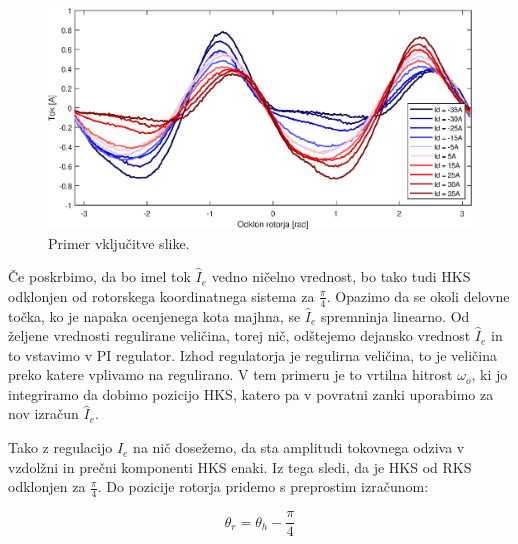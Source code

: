 \documentclass[a4paper,twoside,openright,12pt,slovene]{book}
\begin{document}
\begin{figure}[!htbp]
    \centering
    \includegraphics[width=1\columnwidth]{Slike/reguliranaVelicinaIs.eps}
    \caption{\label{reguliranaVelicinaIs} Primer vključitve slike.}
\end{figure}

Če poskrbimo, da bo imel tok $\hat{I}_{e}$ vedno ničelno vrednost, bo tako tudi HKS odklonjen od rotorskega koordinatnega sistema za $\frac{\pi}{4}$. Opazimo da se okoli delovne točka, ko je napaka
ocenjenega kota majhna, se $\hat{I}_{e}$ spremninja linearno. Od željene vrednosti regulirane veličina, torej nič, odštejemo dejansko vrednost $\hat{I}_{e}$ in to vstavimo v PI regulator. Izhod
regulatorja je regulirna veličina, to je veličina preko katere vplivamo na regulirano. V tem primeru je to vrtilna hitrost $\omega_o$, ki jo integriramo da dobimo pozicijo HKS, katero pa v povratni zanki
uporabimo za nov izračun $\hat{I}_{e}$. 

Tako z regulacijo $\hat{I}_{e}$ na nič dosežemo, da sta amplitudi tokovnega odziva v vzdolžni in prečni komponenti HKS enaki. Iz tega sledi, da je HKS od RKS odklonjen za $\frac{\pi}{4}$. Do pozicije
rotorja pridemo s preprostim izračunom:

\begin{equation}
    \theta_{r} = \theta_{h} - \frac{\pi}{4}
\end{equation}
\end{document}
